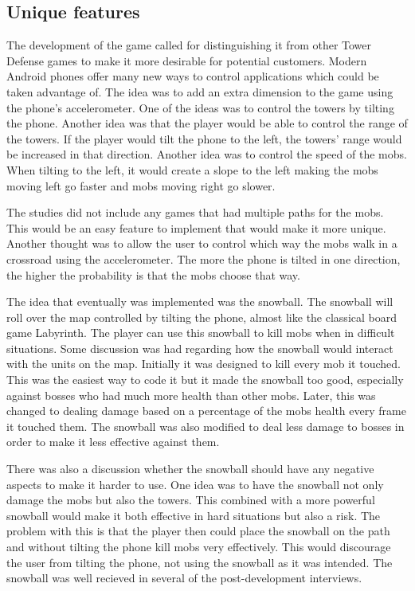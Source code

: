 \subsection{Unique features}
The development of the game called for distinguishing it from other Tower Defense games to make it more desirable for potential customers. Modern Android phones offer many new ways to control applications which could be taken advantage of. The idea was to add an extra dimension to the game using the phone's accelerometer. One of the ideas was to control the towers by tilting the phone. Another idea was that the player would be able to control the range of the towers. If the player would tilt the phone to the left, the towers' range would be increased in that direction. Another idea was to control the speed of the mobs. When tilting to the left, it would create a slope to the left making the mobs moving left go faster and mobs moving right go slower. 

The studies did not include any games that had multiple paths for the mobs. This would be an easy feature to implement that would make it more unique. Another thought was to allow the user to control which way the mobs walk in a crossroad using the accelerometer. The more the phone is tilted in one direction, the higher the probability is that the mobs choose that way.

The idea that eventually was implemented was the snowball. The snowball will roll over the map controlled by tilting the phone, almost like the classical board game Labyrinth. The player can use this snowball to kill mobs when in difficult situations. Some discussion was had regarding how the snowball would interact with the units on the map. Initially it was designed to kill every mob it touched. This was the easiest way to code it but it made the snowball too good, especially against bosses who had much more health than other mobs. Later, this was changed to dealing damage based on a percentage of the mobs health every frame it touched them. The snowball was also modified to deal less damage to bosses in order to make it less effective against them.

There was also a discussion whether the snowball should have any negative aspects to make it harder to use. One idea was to have the snowball not only damage the mobs but also the towers. This combined with a more powerful snowball would make it both effective in hard situations but also a risk. The problem with this is that the player then could place the snowball on the path and without tilting the phone kill mobs very effectively. This would discourage the user from tilting the phone, not using the snowball as it was intended. The snowball was well recieved in several of the post-development interviews. 

